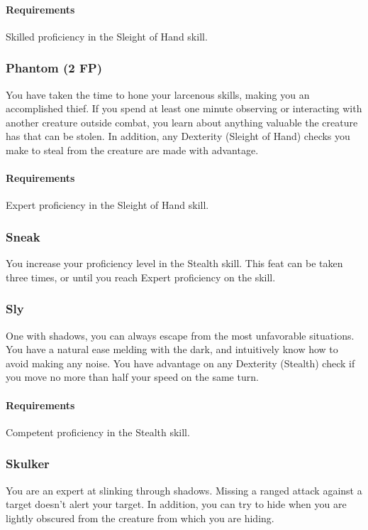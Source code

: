    \paragraph{Requirements} Skilled proficiency in the Sleight of Hand skill.
\subsubsection{Phantom (2 FP)} \label{feat::phantom} %
    You have taken the time to hone your larcenous skills, making you an accomplished thief.
    If you spend at least one minute observing or interacting with another creature outside combat, you learn about anything valuable the creature has that can be stolen.
    In addition, any Dexterity (Sleight of Hand) checks you make to steal from the creature are made with advantage.
    \paragraph{Requirements} Expert proficiency in the Sleight of Hand skill.
\subsubsection{Sneak} \label{feat::sneak}
    You increase your proficiency level in the Stealth skill.
    This feat can be taken three times, or until you reach Expert proficiency on the skill.
\subsubsection{Sly} \label{feat::sly}
    One with shadows, you can always escape from the most unfavorable situations.
    You have a natural ease melding with the dark, and intuitively know how to avoid making any noise.
    You have advantage on any Dexterity (Stealth) check if you move no more than half your speed on the same turn.
    \paragraph{Requirements} Competent proficiency in the Stealth skill.
\subsubsection{Skulker} \label{feat::skulker}
    You are an expert at slinking through shadows.
    Missing a ranged attack against a target doesn't alert your target.
    In addition, you can try to hide when you are lightly obscured from the creature from which you are hiding.
